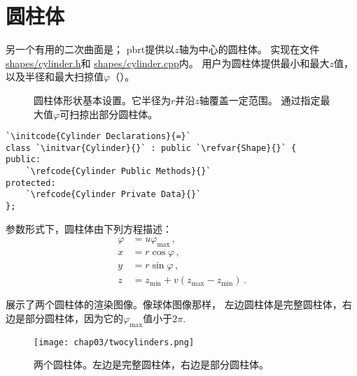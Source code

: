 \section{圆柱体}\label{sec:圆柱体}

另一个有用的二次曲面是；
pbrt提供以$z$轴为中心的圆柱体。
实现在文件\href{https://github.com/mmp/pbrt-v3/tree/master/src/shapes/cylinder.h}{\ttfamily shapes/cylinder.h}和
\href{https://github.com/mmp/pbrt-v3/tree/master/src/shapes/cylinder.cpp}{\ttfamily shapes/cylinder.cpp}内。
用户为圆柱体提供最小和最大$z$值，以及半径和最大扫掠值$\varphi$（）。
\begin{figure}[htbp]
    \centering
    \caption{圆柱体形状基本设置。它半径为$r$并沿$z$轴覆盖一定范围。
        通过指定最大值$\varphi$可扫掠出部分圆柱体。}
    \label{fig:3.6}
\end{figure}
\begin{lstlisting}
`\initcode{Cylinder Declarations}{=}`
class `\initvar{Cylinder}{}` : public `\refvar{Shape}{}` {
public:
    `\refcode{Cylinder Public Methods}{}`
protected:
    `\refcode{Cylinder Private Data}{}`
};
\end{lstlisting}

参数形式下，圆柱体由下列方程描述：
\begin{align*}
    \varphi & =u\varphi_{\max}\, ,               \\
    x       & =r\cos\varphi\, ,                  \\
    y       & =r\sin\varphi\, ,                  \\
    z       & =z_{\min}+v(z_{\max}-z_{\min})\, .
\end{align*}

展示了两个圆柱体的渲染图像。像球体图像那样，
左边圆柱体是完整圆柱体，右边是部分圆柱体，因为它的$\varphi_{\max}$值小于$2\pi$.
\begin{figure}[htbp]
    \centering\texttt{[image: chap03/twocylinders.png]}
    \caption{两个圆柱体。左边是完整圆柱体，右边是部分圆柱体。}
    \label{fig:3.7}
\end{figure}

